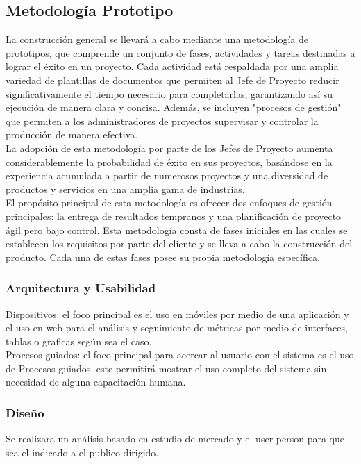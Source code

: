 \documentclass{report}
\begin{document}
			\subsection{Metodología Prototipo}
			La construcción general se llevará a cabo mediante una metodología de prototipos, que comprende un conjunto de fases, actividades y tareas destinadas a lograr el éxito en un proyecto. Cada actividad está respaldada por una amplia variedad de plantillas de documentos que permiten al Jefe de Proyecto reducir significativamente el tiempo necesario para completarlas, garantizando así su ejecución de manera clara y concisa. Además, se incluyen "procesos de gestión" que permiten a los administradores de proyectos supervisar y controlar la producción de manera efectiva.\\
			
			La adopción de esta metodología por parte de los Jefes de Proyecto aumenta considerablemente la probabilidad de éxito en sus proyectos, basándose en la experiencia acumulada a partir de numerosos proyectos y una diversidad de productos y servicios en una amplia gama de industrias.\\
			
			El propósito principal de esta metodología es ofrecer dos enfoques de gestión principales: la entrega de resultados tempranos y una planificación de proyecto ágil pero bajo control. Esta metodología consta de fases iniciales en las cuales se establecen los requisitos por parte del cliente y se lleva a cabo la construcción del producto. Cada una de estas fases posee su propia metodología específica.
			
				\subsubsection{Arquitectura y Usabilidad}
					Dispositivos: el foco principal es el uso en móviles por medio de una aplicación y el uso en web para el análisis y seguimiento de métricas por medio de interfaces, tablas o graficas según sea el caso. \\
					\break
					Procesos guiados: el foco principal para acercar al usuario con el sistema es el uso de Procesos guiados, este permitirá mostrar el uso completo del sistema sin necesidad de alguna capacitación humana.\\
					
					\subsubsection{Diseño}
						Se realizara un análisis basado en estudio de mercado y el user person para que sea el indicado a el publico dirigido.
						
\end{document}

